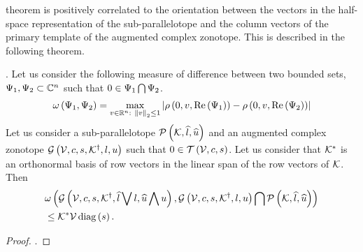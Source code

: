 theorem is positively correlated to the orientation between the
vectors in the half-space representation of the sub-parallelotope and
the column vectors of the primary template of the augmented complex
zonotope.  This is described in the following theorem.
%
\begin{theorem}.
Let us consider the following measure of difference between two
bounded sets, $\Psi_1,\Psi_2\subset\mathbb{C}^n$ such that
$0\in\Psi_1\bigcap \Psi_2$.
%
\[
\omega\left(\Psi_1,\Psi_2\right)=\max_{v\in\mathbb{R}^n:~\left\|v\right\|_2\leq 1}\left|\rho\left(0,v,\operatorname{Re}\left(\Psi_1\right)\right)-\rho\left(0,v,\operatorname{Re}\left(\Psi_2\right)\right)\right|
\]
%
Let us consider a sub-parallelotope $\mathcal{P}\left(\mathcal{K},\widehat{l},\widehat{u}\right)$ and
an augmented complex zonotope
$\mathcal{G}\left(\mathcal{V},c,s,{\mathcal{K}}^\dagger,l,u\right)$ such that
$0\in\mathit{\operatorname{\mathcal{T}}}\left(\mathcal{V},c,s\right)$.  Let us consider that $\mathcal{K}^*$
is an orthonormal basis of row vectors in the linear span of the row
vectors of $\mathcal{K}$.  Then
%
\begin{align}
& \omega\left(\mathcal{G}\left(\mathcal{V},c,s,{\mathcal{K}}^\dagger,\widehat{l}\bigvee l,\widehat{u}\bigwedge u\right),\mathcal{G}\left(\mathcal{V},c,s,{\mathcal{K}}^\dagger,l,u\right)\bigcap \mathcal{P}\left(\mathcal{K},\widehat{l},\widehat{u}\right)\right)
  \nonumber \\
& \leq \mathcal{K}^*\mathcal{V}\operatorname{diag}\left(s\right).
\end{align}
%
\end{theorem}
%
\begin{proof}
{\color{red}{TODO}}.
\end{proof}
